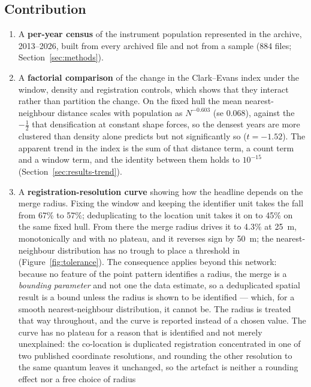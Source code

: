 \documentclass{article}
\newcommand{\nArchiveFiles}{884}
\newcommand{\rDrop}{67}
\newcommand{\cleanSlopeLoc}{-0.603}
\newcommand{\cleanSELoc}{0.068}
\newcommand{\cleanTLoc}{-1.52}
\newcommand{\locHullDrop}{45}
\newcommand{\rHullDrop}{57}
\begin{document}
\subsection{Contribution}
\label{sec:contribution}

\begin{enumerate}
\item A \textbf{per-year census} of the instrument population represented in the archive,
2013--2026, built from every archived file and not from a sample (\nArchiveFiles{} files;
Section~\ref{sec:methods}).
\item A \textbf{factorial comparison} of the change in the Clark--Evans index under the window,
density and registration controls, which shows that they interact rather than partition the
change. On the fixed hull the mean nearest-neighbour distance scales with
population as $N^{\cleanSlopeLoc}$ (se \cleanSELoc), against the $-\tfrac12$ that densification
at constant shape forces, so the densest years are more clustered than density alone predicts but
not significantly so ($t = \cleanTLoc$). The apparent trend in the index is the sum of that
distance term, a count term and a window term, and the identity between them holds to
$10^{-15}$ (Section~\ref{sec:results-trend}).
\item A \textbf{registration-resolution curve} showing how the headline depends on the merge
radius. Fixing the window and keeping the identifier unit takes the fall from \rDrop\% to
\rHullDrop\%; deduplicating to the location unit takes it on to \locHullDrop\% on the same fixed
hull. From there the merge radius drives it to \num{4.3}\% at \SI{25}{\meter}, monotonically and
with no plateau, and it reverses sign
by \SI{50}{\meter}; the nearest-neighbour distribution has no trough to place a threshold in
(Figure~\ref{fig:tolerance}). The consequence applies beyond this network:
because no feature of the point pattern identifies a radius, the merge is a \emph{bounding
parameter} and not one the data estimate, so a deduplicated spatial result is a bound unless the
radius is shown to be identified --- which, for a smooth nearest-neighbour distribution, it
cannot be. The radius is treated that way throughout, and the curve is reported instead of a
chosen value. The curve has no plateau for a reason that is identified and not merely
unexplained: the
co-location is duplicated registration concentrated in one of two published coordinate
resolutions, and rounding the other resolution to the same quantum leaves it unchanged, so the
artefact is neither a rounding effect nor a free choice of radius

\end{enumerate}
\end{document}
